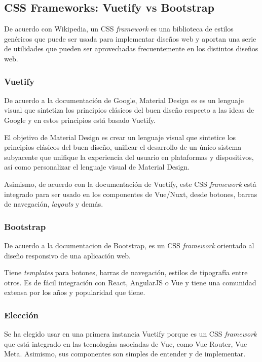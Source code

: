 \subsection{CSS Frameworks: Vuetify vs Bootstrap}
De acuerdo con Wikipedia\cite{wikipedia_contributors_css_2020}, un CSS \textit{framework} es una biblioteca de estilos genéricos que puede ser usada para implementar diseños web y aportan una serie de utilidades que pueden ser aprovechadas frecuentemente en los distintos diseños web.
\subsubsection*{Vuetify}
De acuerdo a la documentación de Google\cite{noauthor_introduction_nodate}, Material Design es es un lenguaje visual que sintetiza los principios clásicos del buen diseño respecto a las ideas de Google y en estos principios está basado Vuetify.


El objetivo de Material Design es crear un lenguaje visual que sintetice los principios clásicos del buen diseño, unificar el desarrollo de un único sistema subyacente que unifique la experiencia del usuario en plataformas y dispositivos, así como personalizar el lenguaje visual de Material Design.


Asimismo, de acuerdo con la documentación de Vuetify\cite{noauthor_vuetify_nodate}, este CSS \textit{framework} está integrado para ser usado en los componentes de Vue/Nuxt, desde botones, barras de navegación, \textit{layouts} y demás.

\subsubsection*{Bootstrap}

De acuerdo a la documentacion de Bootstrap\cite{noauthor_documentation_nodate-1}, es un CSS \textit{framework} orientado al diseño responsivo de una aplicación web. 


Tiene \textit{templates} para botones, barras de navegación, estilos de tipografía entre otros. Es de fácil integración con React, AngularJS o Vue y tiene una comunidad extensa por los años y popularidad que tiene.

\subsubsection*{Elección}

Se ha elegido usar en una primera instancia Vuetify porque es un CSS \textit{framework} que está integrado en las tecnologías asociadas de Vue, como Vue Router, Vue Meta. Asimismo, sus componentes son simples de entender y de implementar.
